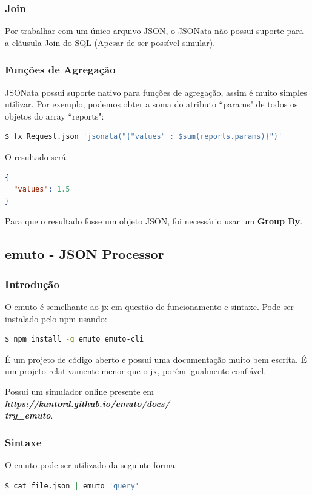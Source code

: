 \documentclass[a4paper, 12pt] {article}
\begin{document}
			\subsubsection{Join}
				Por trabalhar com um único arquivo JSON, o JSONata não possui suporte para a cláusula Join do SQL (Apesar de ser possível simular).
			\subsubsection{Funções de Agregação}
				JSONata possui suporte nativo para funções de agregação, assim é muito simples utilizar. Por exemplo, podemos obter a soma do atributo “params" de todos os objetos do array “reports":
\begin{lstlisting}[language=bash]
$ fx Request.json 'jsonata("{"values" : $sum(reports.params)}")'
\end{lstlisting}

				O resultado será:
\begin{lstlisting}[language=json,firstnumber=1]
{
  "values": 1.5
}
\end{lstlisting}

				Para que o resultado fosse um objeto JSON, foi necessário usar um \textbf{Group By}.
		\newpage \subsection{emuto - JSON Processor}
			\subsubsection{Introdução}
				O emuto é semelhante ao jx em questão de funcionamento e sintaxe. Pode ser instalado pelo npm usando:
\begin{lstlisting}[language=bash]
$ npm install -g emuto emuto-cli
\end{lstlisting}

				É um projeto de código aberto e possui uma documentação muito bem escrita. É um projeto relativamente menor que o jx, porém igualmente confiável.

				Possui um simulador online presente em \textit{\textbf{https://kantord.github.io/emuto/docs/\\try\_emuto}}.
			\subsubsection{Sintaxe}
				O emuto pode ser utilizado da seguinte forma:
\begin{lstlisting}[language=bash]
$ cat file.json | emuto 'query'
\end{lstlisting}
\end{document}
